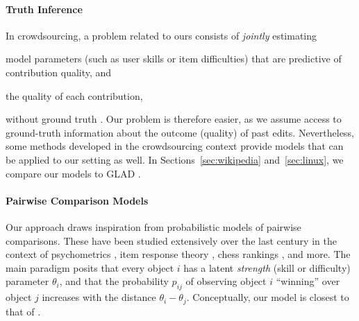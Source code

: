 \paragraph{Truth Inference}
In crowdsourcing, a problem related to ours consists of \emph{jointly} estimating
\begin{enuminline}
\item model parameters (such as user skills or item difficulties) that are predictive of contribution quality, and
\item the quality of each contribution,
\end{enuminline}
without ground truth \citep{dawid1979maximum}.
Our problem is therefore easier, as we assume access to ground-truth information about the outcome (quality) of past edits.
Nevertheless, some methods developed in the crowdsourcing context \citep{whitehill2009whose, welinder2010multidimensional, zhou2012learning} provide models that can be applied to our setting as well.
In Sections~\ref{sec:wikipedia} and~\ref{sec:linux}, we compare our models to GLAD \citep{whitehill2009whose}.


\paragraph{Pairwise Comparison Models}
Our approach draws inspiration from probabilistic models of pairwise comparisons.
These have been studied extensively over the last century in the context of psychometrics \citep{thurstone1927law, bradley1952rank}, item response theory \citep{rasch1960probabilistic}, chess rankings \citep{zermelo1928berechnung, elo1978rating}, and more.
The main paradigm posits that every object $i$ has a latent \emph{strength} (skill or difficulty) parameter $\theta_i$, and that the probability $p_{ij}$ of observing object $i$ ``winning'' over object $j$ increases with the distance $\theta_i - \theta_j$.
Conceptually, our model is closest to that of \citet{rasch1960probabilistic}.

